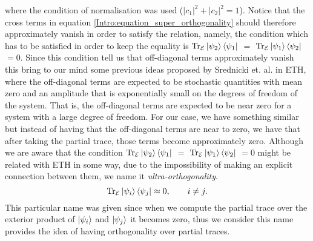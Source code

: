 where the condition of normalisation was used ($|c_1|^2 + |c_2|^2 =1$). Notice that the cross terms in equation \eqref{Intro:equation_super_orthogonality} should therefore approximately vanish in order to satisfy the relation, namely, the condition which has to be satisfied in order to keep the equality is $\operatorname{Tr}_{\mathcal{E}}\mathinner{|{\psi_2}\rangle}\mathinner{\langle{\psi_1}|}$ $=$ $\operatorname{Tr}_{\mathcal{E}}\mathinner{|{\psi_1}\rangle}\mathinner{\langle{\psi_2}|}$ $=0$. Since this condition tell us that off-diagonal terms approximately vanish this bring to our mind some previous ideas proposed by Srednicki et. al.\cite{srednicki_chaos_1994,deutsch_quantum_1991,rigol_alternatives_2012} in ETH, where the off-diagonal terms are expected to be stochastic quantities with mean zero and an amplitude that is exponentially small on the degrees of freedom of the system. That is, the off-diagonal terms are expected to be near zero for a system with a large degree of freedom. For our case, we have something similar but instead of having that the off-diagonal terms are near to zero, we have that after taking the partial trace, those terms become approximately zero. Although we are aware that the condition $\operatorname{Tr}_{\mathcal{E}}\mathinner{|{\psi_2}\rangle}\mathinner{\langle{\psi_1}|}$ $=$ $\operatorname{Tr}_{\mathcal{E}}\mathinner{|{\psi_1}\rangle}\mathinner{\langle{\psi_2}|}$ $=0$ might be related with ETH in some way, due to the impossibility of making an explicit connection between them, we name it \textit{ultra-orthogonality}. 
\begin{equation}
\operatorname{Tr}_{\mathcal{E}}\mathinner{|{\psi_i}\rangle}\mathinner{\langle{\psi_j}|} \approx 0,\quad \quad i\neq j.
\label{Intro:Condition_ultraorthogonality}
\end{equation}
\indent This particular name was given since when we compute the partial trace over the exterior product of $\mathinner{|{\psi_i}\rangle}$ and $\mathinner{|{\psi_j}\rangle}$ it becomes zero, thus we consider this name provides the idea of having orthogonality over partial traces.\\


